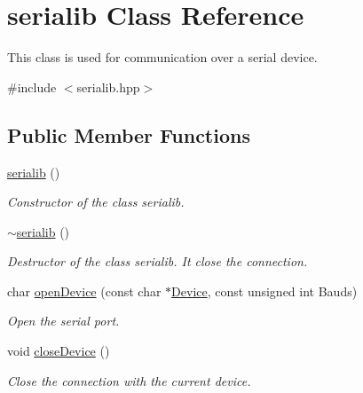 \hypertarget{classserialib}{}\section{serialib Class Reference}
\label{classserialib}


This class is used for communication over a serial device.  




{\ttfamily \#include $<$serialib.\+hpp$>$}

\subsection*{Public Member Functions}
\begin{DoxyCompactItemize}
\item 
\mbox{\label{classserialib_a26166f63ad73013ca7cbcd2ae59edc91}} 
\hyperlink{classserialib_a26166f63ad73013ca7cbcd2ae59edc91}{serialib} ()
\begin{DoxyCompactList}\small\item\em Constructor of the class serialib. \end{DoxyCompactList}\item 
\mbox{\label{classserialib_ac44215001ae198f2c196bb7993327a4b}} 
\hyperlink{classserialib_ac44215001ae198f2c196bb7993327a4b}{$\sim$serialib} ()
\begin{DoxyCompactList}\small\item\em Destructor of the class serialib. It close the connection. \end{DoxyCompactList}\item 
char \hyperlink{classserialib_a5c2f95793e0fcd7fa6615682e8f58f16}{open\+Device} (const char $\ast$\hyperlink{classDevice}{Device}, const unsigned int Bauds)
\begin{DoxyCompactList}\small\item\em Open the serial port. \end{DoxyCompactList}\item 
\mbox{\label{classserialib_a8a1c8803c8df1a19222d6006328534b8}} 
void \hyperlink{classserialib_a8a1c8803c8df1a19222d6006328534b8}{close\+Device} ()
\begin{DoxyCompactList}\small\item\em Close the connection with the current device. \end{DoxyCompactList}\item 

\end{DoxyCompactItemize}
